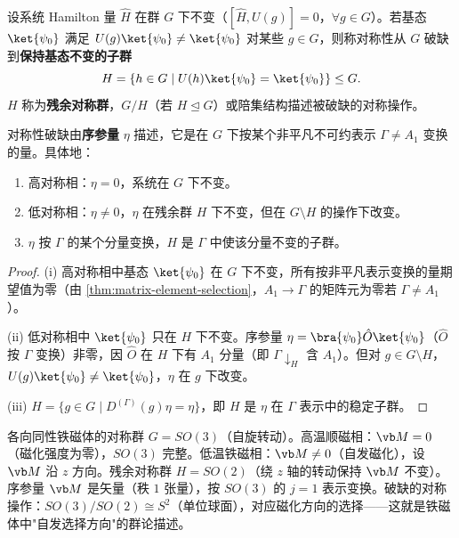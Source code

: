 \begin{definition}[对称性破缺]
设系统 Hamilton 量 $\hat H$ 在群 $G$ 下不变（$[\hat H,U(g)]=0$，$\forall g\in G$）。若基态 $\ket{\psi_0}$ 满足 $U(g)\ket{\psi_0}\ne\ket{\psi_0}$ 对某些 $g\in G$，则称对称性从 $G$ 破缺到\textbf{保持基态不变的子群}
\[
H=\{h\in G\mid U(h)\ket{\psi_0}=\ket{\psi_0}\}\le G.
\]
$H$ 称为\textbf{残余对称群}，$G/H$（若 $H\mathrel{\trianglelefteq} G$）或陪集结构描述被破缺的对称操作。
\end{definition}

\begin{proposition}[序参量的表示论]
\label{prop:order-parameter}
对称性破缺由\textbf{序参量} $\eta$ 描述，它是在 $G$ 下按某个非平凡不可约表示 $\Gamma\ne A_1$ 变换的量。具体地：
\begin{enumerate}[label=(\roman*),leftmargin=3em]
\item 高对称相：$\eta=0$，系统在 $G$ 下不变。
\item 低对称相：$\eta\ne0$，$\eta$ 在残余群 $H$ 下不变，但在 $G\setminus H$ 的操作下改变。
\item $\eta$ 按 $\Gamma$ 的某个分量变换，$H$ 是 $\Gamma$ 中使该分量不变的子群。
\end{enumerate}
\end{proposition}

\begin{proof}
(i) 高对称相中基态 $\ket{\psi_0}$ 在 $G$ 下不变，所有按非平凡表示变换的量期望值为零（由 \cref{thm:matrix-element-selection}，$A_1\to\Gamma$ 的矩阵元为零若 $\Gamma\ne A_1$）。

(ii) 低对称相中 $\ket{\psi_0}$ 只在 $H$ 下不变。序参量 $\eta=\bra{\psi_0}\hat O\ket{\psi_0}$（$\hat O$ 按 $\Gamma$ 变换）非零，因 $\hat O$ 在 $H$ 下有 $A_1$ 分量（即 $\Gamma\downarrow_H$ 含 $A_1$）。但对 $g\in G\setminus H$，$U(g)\ket{\psi_0}\ne\ket{\psi_0}$，$\eta$ 在 $g$ 下改变。

(iii) $H=\{g\in G\mid D^{(\Gamma)}(g)\eta=\eta\}$，即 $H$ 是 $\eta$ 在 $\Gamma$ 表示中的稳定子群。
\end{proof}

\begin{example}[{铁磁相变的序参量}]
各向同性铁磁体的对称群 $G=SO(3)$（自旋转动）。高温顺磁相：$\vb M=0$（磁化强度为零），$SO(3)$ 完整。低温铁磁相：$\vb M\ne0$（自发磁化），设 $\vb M$ 沿 $z$ 方向。残余对称群 $H=SO(2)$（绕 $z$ 轴的转动保持 $\vb M$ 不变）。序参量 $\vb M$ 是矢量（秩 $1$ 张量），按 $SO(3)$ 的 $j=1$ 表示变换。破缺的对称操作：$SO(3)/SO(2)\cong S^2$（单位球面），对应磁化方向的选择——这就是铁磁体中"自发选择方向"的群论描述。
\end{example}

